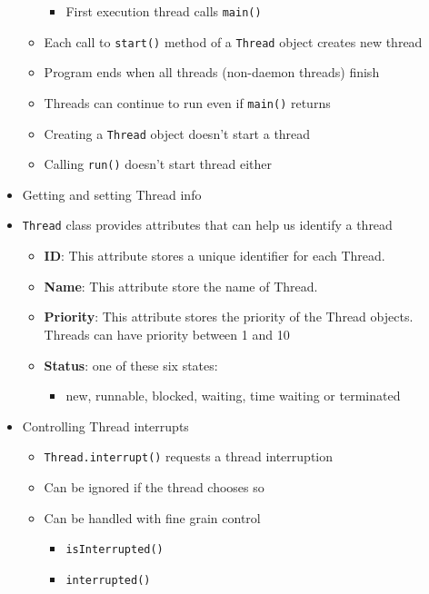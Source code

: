 \documentclass[a4paper]{article}
\newcommand{\inline}[1]{\lstinline!#1!}%
\begin{document}
\begin{itemize}
\begin{itemize}
\begin{itemize}
						\item First execution thread calls \inline{main()}
					\end{itemize}
				\item Each call to \inline{start()} method of a \inline{Thread} object creates new thread
				\item Program ends when all threads (non-daemon threads) finish
				\item Threads can continue to run even if \inline{main()} returns
				\item Creating a \inline{Thread} object doesn't start a thread
				\item Calling \inline{run()} doesn't start  thread either
 			\end{itemize}
 		\item Getting and setting Thread info
 			\item \inline{Thread} class provides attributes that can help us identify a thread
 				\begin{itemize}
 					\item \textbf{ID}: This attribute stores a unique identifier for each Thread.
 					\item \textbf{Name}: This attribute store the name of Thread.
 					\item \textbf{Priority}: This attribute stores the priority of the Thread objects. Threads can have priority between 1 and 10
 					\item \textbf{Status}: one of these six states:
 						\begin{itemize}
 							\item new, runnable, blocked, waiting, time waiting or terminated
 						\end{itemize} 					
 				\end{itemize}
 		\item Controlling Thread interrupts
 			\begin{itemize}
 				\item \inline{Thread.interrupt()} requests a thread interruption
 				\item Can be ignored if the thread chooses so
 				\item Can be handled with fine grain control
 					\begin{itemize}
 						\item \inline{isInterrupted()}
 						\item \inline{interrupted()}
 					\end{itemize}
 			\end{itemize}

\end{itemize}
\end{document}
